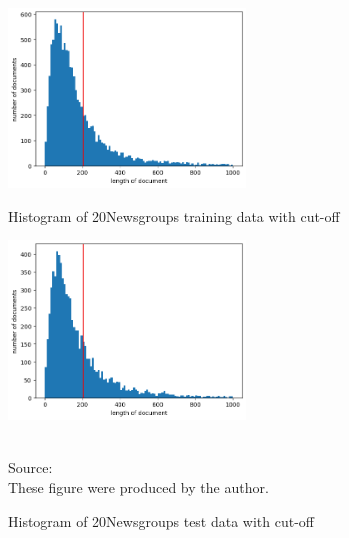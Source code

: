 \begin{figure}
	\centering
	\begin{minipage}{0.45\textwidth}
		\centering
		\includegraphics[height=180px]{gfx/4-Design/cut_training.png}
		\caption{Histogram of 20Newsgroups training data with cut-off}
		\label{fig:Cut-Training}
	\end{minipage}\hfill
	\begin{minipage}{0.45\textwidth}
		\centering
		\includegraphics[height=180px]{gfx/4-Design/cut_test.png}
		\caption{Histogram of 20Newsgroups test data with cut-off}
		\label{fig:Cut-Test}
	\end{minipage}
	\vspace{7pt}
	\footnotesize{ 
		\\
		Source:\\
		These figure were produced by the author.
	}
\end{figure}



